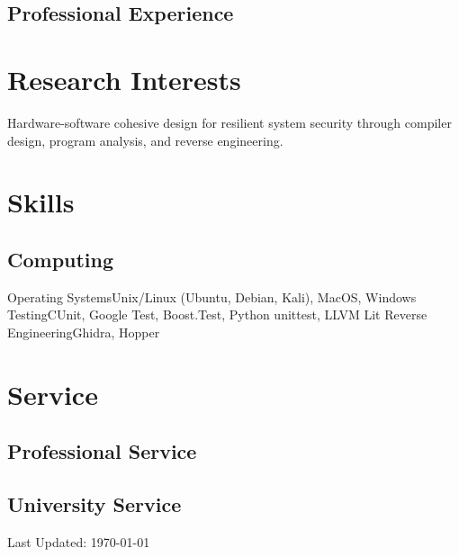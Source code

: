 \documentclass[letterpaper,nolmodern]{moderncv}
\begin{document}
\subsection{Professional Experience}

\section{Research Interests}

Hardware-software cohesive design for resilient system security through compiler design, program analysis, and reverse engineering.

\section{Skills}
\subsection{Computing}
%
{Operating Systems}{Unix/Linux (Ubuntu, Debian, Kali), MacOS, Windows}%
%
{Testing}{CUnit, Google Test, Boost.Test, Python unittest, LLVM Lit}%
%
{Reverse Engineering}{Ghidra, Hopper}%


\section{Service}
\subsection{Professional Service}
\subsection{University Service}

\emptysection{}\closesection
\vfill
\begin{center}
Last Updated: \today{}
\end{center}
\end{document}
